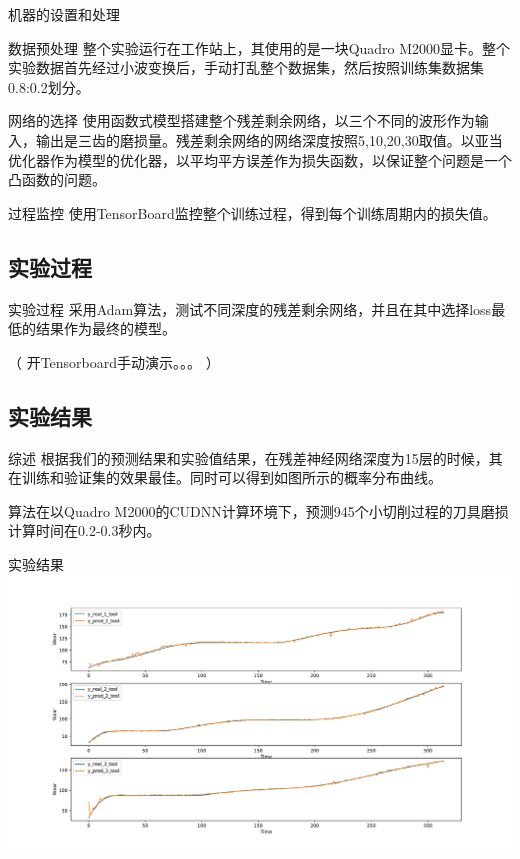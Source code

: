\documentclass[12pt,aspectratio=169]{beamer}
\begin{document}
	\begin{frame}{机器的设置和处理}
		\begin{block}{数据预处理}
			整个实验运行在工作站上，其使用的是一块Quadro M2000显卡。整个实验数据首先经过小波变换后，手动打乱整个数据集，然后按照训练集数据集0.8:0.2划分。
		\end{block}
		
		\begin{block}{网络的选择}
			使用函数式模型搭建整个残差剩余网络，以三个不同的波形作为输入，输出是三齿的磨损量。残差剩余网络的网络深度按照5,10,20,30取值。以亚当优化器作为模型的优化器，以平均平方误差作为损失函数，以保证整个问题是一个凸函数的问题。
		\end{block}
		
		\begin{block}{过程监控}
			使用TensorBoard监控整个训练过程，得到每个训练周期内的损失值。
		\end{block}
		
		
	\end{frame}
	
	\subsection{实验过程}
	\begin{frame}{实验过程}
		采用Adam算法，测试不同深度的残差剩余网络，并且在其中选择loss最低的结果作为最终的模型。
		
		（ 开Tensorboard手动演示。。。 ）
		
	\end{frame}
	
	
	\subsection{实验结果}
	\begin{frame}{综述}
		根据我们的预测结果和实验值结果，在残差神经网络深度为15层的时候，其在训练和验证集的效果最佳。同时可以得到如图所示的概率分布曲线。
		
		算法在以Quadro M2000的CUDNN计算环境下，预测945个小切削过程的刀具磨损计算时间在0.2-0.3秒内。
	\end{frame}
	
	
	
	\begin{frame}{实验结果}
		\centering
		\includegraphics[height=0.9\textheight]{picture/x_tool}

	\end{frame}
	
\end{document}
